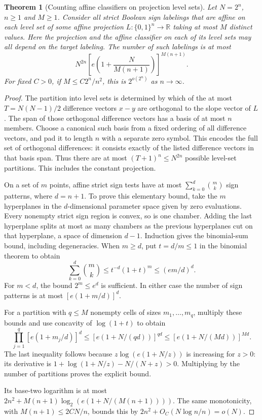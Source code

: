 \documentclass[11pt]{article}
\newtheorem{theorem}{Theorem}
\begin{document}
\begin{theorem}[Counting affine classifiers on projection level sets]
Let $N=2^n$, $n\ge1$ and $M\ge1$. Consider all strict Boolean sign
labelings that are affine on each level set of some affine projection
$L:\{0,1\}^n\to\mathbb R$ taking at most $M$ distinct values.
Here the projection and the affine classifier on each of its level
sets may all depend on the target labeling. The number of such
labelings is at most
\[
 N^{2n}\left[e\left(1+\frac{N}{M(n+1)}\right)\right]^{M(n+1)}.
\]
For fixed $C>0$, if $M\le C2^n/n^2$, this is $2^{o(2^n)}$ as
$n\to\infty$.
\end{theorem}
\begin{proof}
The partition into level sets is determined by which of the at most
$T=N(N-1)/2$ difference vectors $x-y$ are orthogonal to the slope
vector of $L$. The span of those orthogonal difference vectors has a
basis of at most $n$ members. Choose a canonical such basis from a
fixed ordering of all difference vectors, and pad it to length $n$
with a separate zero symbol. This encodes the full set of orthogonal
differences: it consists exactly of the listed difference vectors in
that basis span. Thus there are at most $(T+1)^n\le N^{2n}$ possible
level-set partitions. This includes the constant projection.

On a set of $m$ points, affine strict sign tests have at most
$\sum_{k=0}^{d}\binom{m}{k}$ sign patterns, where $d=n+1$.
To prove this elementary bound, take the $m$ hyperplanes in the
$d$-dimensional parameter space given by zero evaluations.
Every nonempty strict sign region is convex, so is one chamber.
Adding the last hyperplane splits at most as many chambers as the
previous hyperplanes cut on that hyperplane, a space of dimension
$d-1$. Induction gives the binomial-sum bound, including degeneracies.
When $m\ge d$, put $t=d/m\le1$ in the binomial theorem to obtain
\[
 \sum_{k=0}^{d}\binom{m}{k}
 \le t^{-d}(1+t)^m\le (em/d)^d.
\]
For $m<d$, the bound $2^m\le e^d$ is sufficient. In either case
the number of sign patterns is at most $[e(1+m/d)]^d$.

For a partition with $q\le M$ nonempty cells of sizes $m_1,\ldots,m_q$,
multiply these bounds and use concavity of $\log(1+t)$ to obtain
\[
 \prod_{j=1}^q[e(1+m_j/d)]^d
 \le[e(1+N/(qd))]^{qd}
 \le[e(1+N/(Md))]^{Md}.
\]
The last inequality follows because $z\log(e(1+N/z))$ is increasing
for $z>0$: its derivative is
$1+\log(1+N/z)-N/(N+z)>0$.
Multiplying by the number of partitions proves the explicit bound.

Its base-two logarithm is at most
$2n^2+M(n+1)\log_2(e(1+N/(M(n+1))))$.
The same monotonicity, with $M(n+1)\le2CN/n$, bounds this by
$2n^2+O_C(N\log n/n)=o(N)$.
\end{proof}
\end{document}
